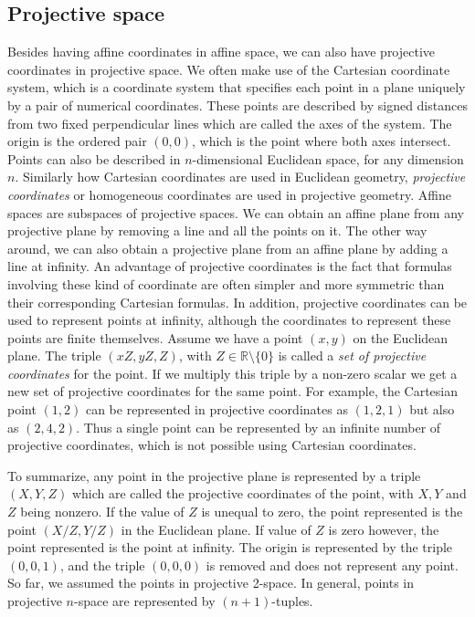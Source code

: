 \subsection{Projective space}
Besides having affine coordinates in affine space, we can also have projective coordinates in projective space.
We often make use of the Cartesian coordinate system, which is a coordinate system that specifies each point in a plane uniquely by a pair of numerical coordinates. These points are described by signed distances from two fixed perpendicular lines which are called the axes of the system. The origin is the ordered pair $(0, 0)$, which is the point where both axes intersect. Points can also be described in $n$-dimensional Euclidean space, for any dimension $n$.
Similarly how Cartesian coordinates are used in Euclidean geometry, \textit{projective coordinates} or homogeneous coordinates are used in projective geometry. 
Affine spaces are subspaces of projective spaces.
We can obtain an affine plane from any projective plane by removing a line and all the points on it.
The other way around, we can also obtain a projective plane from an affine plane by adding a line at infinity.
An advantage of projective coordinates is the fact that formulas involving these kind of coordinate are often simpler and more symmetric than their corresponding Cartesian formulas.
In addition, projective coordinates can be used to represent points at infinity, although the coordinates to represent these points are finite themselves.
Assume we have a point $(x, y)$ on the Euclidean plane.
The triple $(xZ, yZ, Z)$, with $Z \in \mathbb{R} \setminus \{0\}$ is called a \textit{set of projective coordinates} for the point.
If we multiply this triple by a non-zero scalar we get a new set of projective coordinates for the same point. 
For example, the Cartesian point $(1, 2)$ can be represented in projective coordinates as $(1, 2, 1)$ but also as  $(2, 4, 2)$. 
Thus a single point can be represented by an infinite number of projective coordinates, which is not possible using Cartesian coordinates.

To summarize, any point in the projective plane is represented by a triple $(X, Y, Z)$ which are called the projective coordinates of the point, with $X, Y$ and $Z$ being nonzero.
If the value of $Z$ is unequal to zero, the point represented is the point $(X/Z, Y/Z)$ in the Euclidean plane. If value of $Z$ is zero however, the point represented is the point at infinity. The origin is represented by the triple $(0, 0, 1)$, and the triple $(0, 0, 0)$ is removed and does not represent any point. So far, we assumed the points in projective 2-space.
In general, points in projective $n$-space are represented by $(n + 1)$-tuples. 

